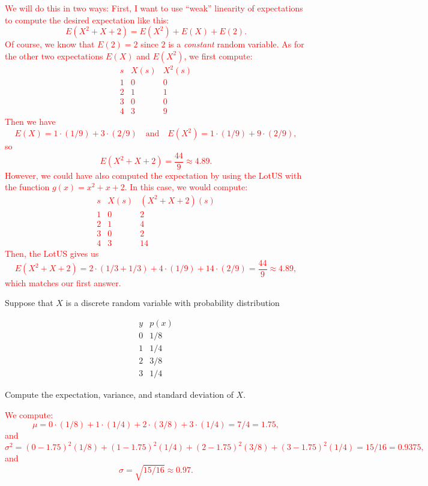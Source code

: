 \documentclass[12pt,reqno]{amsart}
\begin{document}
\bigskip
\textcolor{red}{We will do this in two ways: First, I want to use ``weak'' linearity of expectations to compute the desired expectation like this:
	\[
	E(X^2 + X + 2) = E(X^2) + E(X) + E(2).
	\]
Of course, we know that $E(2)=2$ since $2$ is a \textit{constant} random variable. As for the other two expectations $E(X)$ and $E(X^2)$, we first compute:
	\[
	\begin{array}{c|cc}
	s & X(s) & X^2(s)  \\ \hline
	1 & 0 & 0  \\
	2 & 1 & 1  \\
	3 & 0 & 0 \\
	4 & 3 & 9
	\end{array}
	\]
Then we have
	\[
	E(X) = 1\cdot (1/9) + 3\cdot(2/9) \quad \text{and} \quad E(X^2) = 1 \cdot (1/9) + 9 \cdot (2/9),
	\]
so
	\[
	E(X^2 + X +2) = \frac{44}{9} \approx 4.89.
	\]
However, we could have also computed the expectation by using the LotUS with the function $g(x) = x^2 + x + 2$. In this case, we would compute:
	\[
	\begin{array}{c|cc}
	s & X(s) & (X^2 + X +2)(s)  \\ \hline
	1 & 0 & 2  \\
	2 & 1 & 4  \\
	3 & 0 & 2 \\
	4 & 3 & 14
	\end{array}
	\]
Then, the LotUS gives us
	\[
	E(X^2 + X + 2) = 2\cdot (1/3 + 1/3) + 4\cdot (1/9) + 14\cdot (2/9) = \frac{44}{9} \approx 4.89,
	\]
which matches our first answer.}















\bigskip
\prob Suppose that $X$ is a discrete random variable with probability distribution

	\[
	\begin{array}{c|c}
	y & p(x) \\ \hline
	0 & 1/8   \\
	1 & 1/4   \\
	2 & 3/8  \\
	3 & 1/4 
	\end{array}
	\]

Compute the expectation, variance, and standard deviation of $X$.

\bigskip
\textcolor{red}{We compute:
	\[
	\mu = 0\cdot(1/8) + 1 \cdot(1/4) + 2\cdot(3/8) + 3\cdot(1/4) = 7/4 = 1.75,
	\]
and
	\[
	\sigma^2 = (0-1.75)^2(1/8) + (1-1.75)^2(1/4) + (2-1.75)^2(3/8) + (3-1.75)^2(1/4) = 15/16 = 0.9375,
	\]
and
	\[
	\sigma = \sqrt{15/16} \approx 0.97.
	\]}
\end{document}
